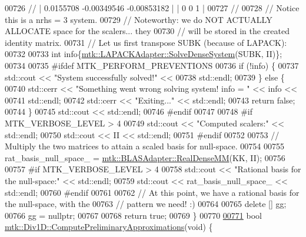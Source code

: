 \begin{DoxyCode}
{{00726   \textcolor{comment}{// | 0.0155708 -0.00349546 -0.00853182 |           | 0 0 1 |}
00727   \textcolor{comment}{//}
00728   \textcolor{comment}{// Notice this is a nrhs = 3 system.}
00729   \textcolor{comment}{// Noteworthy: we do NOT ACTUALLY ALLOCATE space for the scalers... they}
00730   \textcolor{comment}{// will be stored in the created identity matrix.}
00731   \textcolor{comment}{// Let us first transpose SUBK (because of LAPACK):}
00732 
00733   \textcolor{keywordtype}{int} info\{\hyperlink{classmtk_1_1LAPACKAdapter_a7428bccf74fd4a4af68fb7233846da22}{mtk::LAPACKAdapter::SolveDenseSystem}(SUBK, II)\};
00734 
00735 \textcolor{preprocessor}{  #ifdef MTK\_PERFORM\_PREVENTIONS}
00736   \textcolor{keywordflow}{if} (!info) \{
00737     std::cout << \textcolor{stringliteral}{"System successfully solved!"} <<
00738       std::endl;
00739   \} \textcolor{keywordflow}{else} \{
00740     std::cerr << \textcolor{stringliteral}{"Something went wrong solving system! info = "} << info <<
00741       std::endl;
00742     std::cerr << \textcolor{stringliteral}{"Exiting..."} << std::endl;
00743     \textcolor{keywordflow}{return} \textcolor{keyword}{false};
00744   \}
00745   std::cout << std::endl;
00746 \textcolor{preprocessor}{  #endif}
00747 
00748 \textcolor{preprocessor}{  #if MTK\_VERBOSE\_LEVEL > 4}
00749   std::cout << \textcolor{stringliteral}{"Computed scalers:"} << std::endl;
00750   std::cout << II << std::endl;
00751 \textcolor{preprocessor}{  #endif}
00752 
00753   \textcolor{comment}{// Multiply the two matrices to attain a scaled basis for null-space.}
00754 
00755   rat\_basis\_null\_space\_ = \hyperlink{classmtk_1_1BLASAdapter_acebd0e9bfe0bdd609c7fbea98ccfd3b5}{mtk::BLASAdapter::RealDenseMM}(KK, II);
00756 
00757 \textcolor{preprocessor}{  #if MTK\_VERBOSE\_LEVEL > 4}
00758   std::cout << \textcolor{stringliteral}{"Rational basis for the null-space:"} << std::endl;
00759   std::cout << rat\_basis\_null\_space\_ << std::endl;
00760 \textcolor{preprocessor}{  #endif}
00761 
00762   \textcolor{comment}{// At this point, we have a rational basis for the null-space, with the}
00763   \textcolor{comment}{// pattern we need! :)}
00764 
00765   \textcolor{keyword}{delete} [] gg;
00766   gg = \textcolor{keyword}{nullptr};
00767 
00768   \textcolor{keywordflow}{return} \textcolor{keyword}{true};
00769 \}
00770 
\hypertarget{mtk__div__1d_8cc_source_l00771}{}\hyperlink{classmtk_1_1Div1D_a4be0534a4e22d44a7aedde326cc3f3b6}{00771} \textcolor{keywordtype}{bool} \hyperlink{classmtk_1_1Div1D_a4be0534a4e22d44a7aedde326cc3f3b6}{mtk::Div1D::ComputePreliminaryApproximations}(\textcolor{keywordtype}{void}) \{
}}
\end{DoxyCode}
